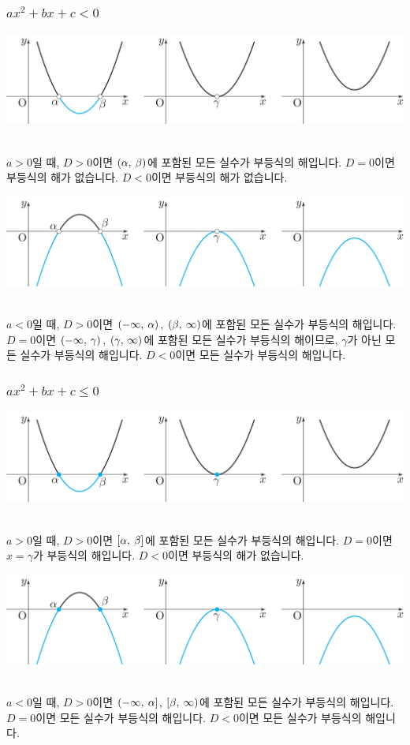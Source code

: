 \subsubsection{$ax^2 + bx + c < 0$}
\begin{center} \includegraphics[scale=\pgfkeysvalueof{picsize}]{DBs/pic/zery_26.pdf}\
	\end{center}$a>0$일 때, $D>0$이면 $\left(\alpha,\: \beta\right)$에 포함된 모든 실수가 부등식의 해입니다. $D=0$이면 부등식의 해가 없습니다. $D<0$이면 부등식의 해가 없습니다. 
\begin{center} \includegraphics[scale=\pgfkeysvalueof{picsize}]{DBs/pic/zery_26_1.pdf}\
	\end{center}$a<0$일 때, $D>0$이면 $\left(-\infty,\: \alpha\right)$, $\left(\beta,\: \infty\right)$에 포함된 모든 실수가 부등식의 해입니다. $D=0$이면 $\left(-\infty,\: \gamma\right)$, $\left(\gamma,\: \infty\right)$에 포함된 모든 실수가 부등식의 해이므로, $\gamma$가 아닌 모든 실수가 부등식의 해입니다. $D<0$이면 모든 실수가 부등식의 해입니다.


\subsubsection{$ax^2 + bx + c \le 0$}
\begin{center} \includegraphics[scale=\pgfkeysvalueof{picsize}]{DBs/pic/zery_27.pdf}\
	\end{center}$a>0$일 때, $D>0$이면 $\left[\alpha,\: \beta\right]$에 포함된 모든 실수가 부등식의 해입니다. $D=0$이면 $x=\gamma$가 부등식의 해입니다. $D<0$이면 부등식의 해가 없습니다.
\begin{center} \includegraphics[scale=\pgfkeysvalueof{picsize}]{DBs/pic/zery_27_1.pdf}\
	\end{center}$a<0$일 때, $D>0$이면 $\left(-\infty,\: \alpha\right]$, $\left[\beta,\: \infty\right)$에 포함된 모든 실수가 부등식의 해입니다. $D=0$이면 모든 실수가 부등식의 해입니다. $D<0$이면 모든 실수가 부등식의 해입니다.
\clearpage
